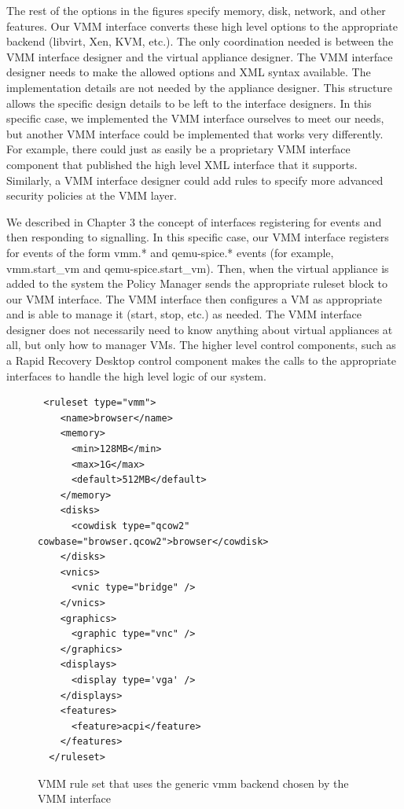 The rest of the options in the figures specify memory, disk, network, and other features. Our VMM interface converts these high level options to the appropriate backend (libvirt, Xen, KVM, etc.). The only coordination needed is between the VMM interface designer and the virtual appliance designer. The VMM interface designer needs to make the allowed options and XML syntax available. The implementation details are not needed by the appliance designer. This structure allows the specific design details to be left to the interface designers. In this specific case, we implemented the VMM interface ourselves to meet our needs, but another VMM interface could be implemented that works very differently. For example, there could just as easily be a proprietary VMM interface component that published the high level XML interface that it supports. Similarly, a VMM interface designer could add rules to specify more advanced security policies at the VMM layer. 

We described in Chapter 3 the concept of interfaces registering for events and then responding to signalling. In this specific case, our VMM interface registers for events of the form vmm.* and qemu-spice.* events (for example, vmm.start\_vm and qemu-spice.start\_vm). Then, when the virtual appliance is added to the system the Policy Manager sends the appropriate ruleset block to our VMM interface. The VMM interface then configures a VM as appropriate and is able to manage it (start, stop, etc.) as needed. The VMM interface designer does not necessarily need to know anything about virtual appliances at all, but only how to manager VMs. The higher level control components, such as a Rapid Recovery Desktop control component makes the calls to the appropriate interfaces to handle the high level logic of our system.

\begin{figure}[tbp]
\caption{VMM rule set that uses the generic vmm backend chosen by the VMM interface}
\label{lst:generic-vmm}
\begin{lstlisting}
 <ruleset type="vmm">
    <name>browser</name>
    <memory>
      <min>128MB</min>
      <max>1G</max>
      <default>512MB</default>
    </memory>
    <disks>
      <cowdisk type="qcow2" cowbase="browser.qcow2">browser</cowdisk>
    </disks>
    <vnics>
      <vnic type="bridge" />
    </vnics>
    <graphics>
      <graphic type="vnc" />
    </graphics>
    <displays>  
      <display type='vga' />
    </displays>
    <features>
      <feature>acpi</feature>
    </features>
  </ruleset>
\end{lstlisting}
\end{figure}

